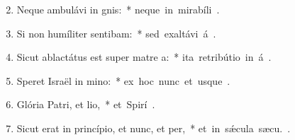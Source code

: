 \begin{flushleft}
\begin{enumerate}[leftmargin=*]
\setcounter{enumi}{1}

\item Neque ambulávi in gnis:~* \mbox{neque in mirabíli  .}
\item Si non humíliter sentibam:~* \mbox{sed exaltávi á .}
\item Sicut ablactátus est super matre a:~* \mbox{ita retribútio in á .}
\item Speret Israël in mino:~* \mbox{ex hoc nunc et usque  .}
\item Glória Patri, et lio,~* \mbox{et Spirí .}
\item Sicut erat in princípio, et nunc, et per,~* \mbox{et in s\'{\ae}cula sæcu. .}

\end{enumerate}
\end{flushleft}

